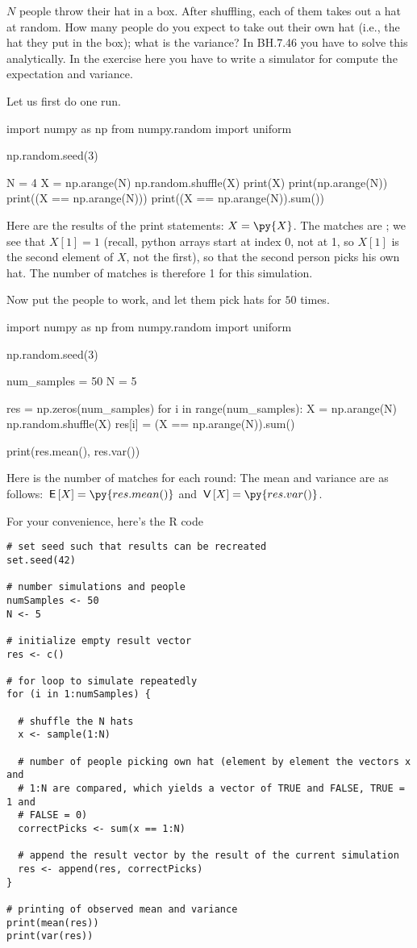 \begin{exercise}
$N$ people throw their hat in a box. After shuffling, each of them takes out a hat at random. How many people do you expect to take out their own hat (i.e., the hat they put in the box); what is the variance? In BH.7.46 you have to solve this analytically. In the exercise here you have to write a simulator for compute the expectation and variance.
\begin{solution}
Let us first do one run.
\begin{pyblock}[][numbers=left,frame=lines]
import numpy as np
from numpy.random import uniform

np.random.seed(3)

N = 4
X = np.arange(N)
np.random.shuffle(X)
print(X)
print(np.arange(N))
print((X == np.arange(N)))
print((X == np.arange(N)).sum())
\end{pyblock}
Here are the results of the print statements: $X = \py{X}$. The matches are ; we see that $X[1] = 1$ (recall, python arrays start at index 0, not at 1, so $X[1]$ is the second element of $X$, not the first), so that the second person picks his own hat. The number of matches is therefore 1 for this simulation.

Now put the people to work, and let them pick hats for $50$ times.
\begin{pyblock}[][numbers=left,frame=lines]
import numpy as np
from numpy.random import uniform

np.random.seed(3)

num_samples = 50
N = 5

res = np.zeros(num_samples)
for i in range(num_samples):
    X = np.arange(N)
    np.random.shuffle(X)
    res[i] = (X == np.arange(N)).sum()

print(res.mean(), res.var())
\end{pyblock}
Here is the number of matches for each round: 
The mean and variance are as follows: $\E X = \py{res.mean()}$ and $\V X = \py{res.var()}$.

For your convenience, here's the R code
\begin{verbatim}
# set seed such that results can be recreated
set.seed(42)

# number simulations and people
numSamples <- 50
N <- 5

# initialize empty result vector
res <- c()

# for loop to simulate repeatedly
for (i in 1:numSamples) {

  # shuffle the N hats
  x <- sample(1:N)

  # number of people picking own hat (element by element the vectors x and
  # 1:N are compared, which yields a vector of TRUE and FALSE, TRUE = 1 and
  # FALSE = 0)
  correctPicks <- sum(x == 1:N)

  # append the result vector by the result of the current simulation
  res <- append(res, correctPicks)
}

# printing of observed mean and variance
print(mean(res))
print(var(res))
\end{verbatim}


\end{solution}
\end{exercise}
